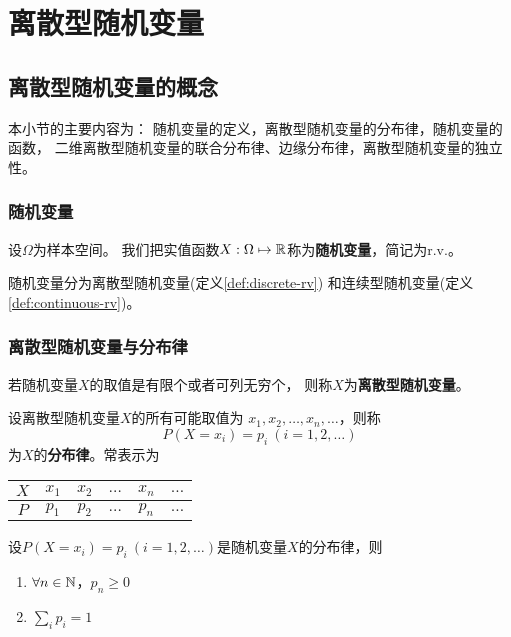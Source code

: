 \chapter{离散型随机变量}

\section{离散型随机变量的概念}
本小节的主要内容为：
随机变量的定义，离散型随机变量的分布律，随机变量的函数，
二维离散型随机变量的联合分布律、边缘分布律，离散型随机变量的独立性。

\subsection{随机变量}
\begin{definition}[随机变量]
  设$\Omega$为样本空间。
  我们把实值函数$X:\Omega\mapsto\mathbb{R}$称为\textbf{随机变量}，简记为r.v.。
\end{definition}

随机变量分为离散型随机变量(定义\ref{def:discrete-rv})
和连续型随机变量(定义\ref{def:continuous-rv})。

\subsection{离散型随机变量与分布律}
\begin{definition}[离散型随机变量] \label{def:discrete-rv}
  若随机变量$X$的取值是有限个或者可列无穷个，
  则称$X$为\textbf{离散型随机变量}。
\end{definition}

\begin{definition}[离散型随机变量的分布律]
  设离散型随机变量$X$的所有可能取值为
  $x_1,x_2,\dots,x_n,\dots$，则称
  \begin{displaymath}
  P(X=x_i)=p_i\ (i=1,2,\dots)
  \end{displaymath}
  为$X$的\textbf{分布律}。常表示为
  \begin{center}
    \begin{tabular}{c|ccccc}
      $X$ & $x_1$ & $x_2$ & $\dots$ & $x_n$ & $\dots$ \\
      \hline
      $P$ & $p_1$ & $p_2$ & $\dots$ & $p_n$ & $\dots$ \\
    \end{tabular}
  \end{center}
\end{definition}

\begin{theorem}[离散型随机变量分布律的性质]
  设$P(X=x_i)=p_i\ (i=1,2,\dots)$是随机变量$X$的分布律，则
  \begin{enumerate}
    \item
    $\forall n\in \mathbb{N}$，$p_n \ge 0$
    \item
    $\sum_{i}p_i = 1$
  \end{enumerate}
\end{theorem}

